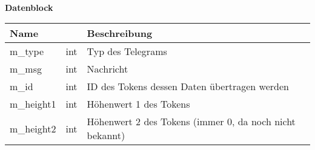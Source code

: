 \documentclass[a4paper,10pt]{article}
\begin{document}
  \textbf{\\ {\large Datenblock}}\\
  \newline
  \begin{tabular}{|l|p{1.4cm}|l|}
    \hline
    \rowcolor{lightgray}\textbf{Name} & \textbf\centering{Datentyp} & \textbf{Beschreibung}\\
    \hline
    m\_type & \centering int & Typ des Telegrams\\
    \hline
    m\_msg & \centering int & Nachricht\\
    \hline
    m\_id & \centering int & ID des Tokens dessen Daten übertragen werden\\
    \hline
    m\_height1 & \centering int & Höhenwert 1 des Tokens\\
    \hline
    m\_height2 & \centering int & Höhenwert 2 des Tokens (immer 0, da noch nicht bekannt)\\
    \hline
  \end{tabular}
\end{document}
